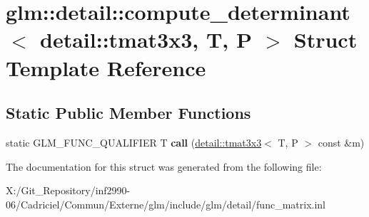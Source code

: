 \hypertarget{structglm_1_1detail_1_1compute__determinant_3_01detail_1_1tmat3x3_00_01_t_00_01_p_01_4}{\section{glm\-:\-:detail\-:\-:compute\-\_\-determinant$<$ detail\-:\-:tmat3x3, T, P $>$ Struct Template Reference}
\label{structglm_1_1detail_1_1compute__determinant_3_01detail_1_1tmat3x3_00_01_t_00_01_p_01_4}
}
\subsection*{Static Public Member Functions}
\begin{DoxyCompactItemize}
\item 
\hypertarget{structglm_1_1detail_1_1compute__determinant_3_01detail_1_1tmat3x3_00_01_t_00_01_p_01_4_aacdeab0c051558a445f3f674dd6a5e8b}{static G\-L\-M\-\_\-\-F\-U\-N\-C\-\_\-\-Q\-U\-A\-L\-I\-F\-I\-E\-R T {\bfseries call} (\hyperlink{structglm_1_1detail_1_1tmat3x3}{detail\-::tmat3x3}$<$ T, P $>$ const \&m)}\label{structglm_1_1detail_1_1compute__determinant_3_01detail_1_1tmat3x3_00_01_t_00_01_p_01_4_aacdeab0c051558a445f3f674dd6a5e8b}

\end{DoxyCompactItemize}


The documentation for this struct was generated from the following file\-:\begin{DoxyCompactItemize}
\item 
X\-:/\-Git\-\_\-\-Repository/inf2990-\/06/\-Cadriciel/\-Commun/\-Externe/glm/include/glm/detail/func\-\_\-matrix.\-inl\end{DoxyCompactItemize}
